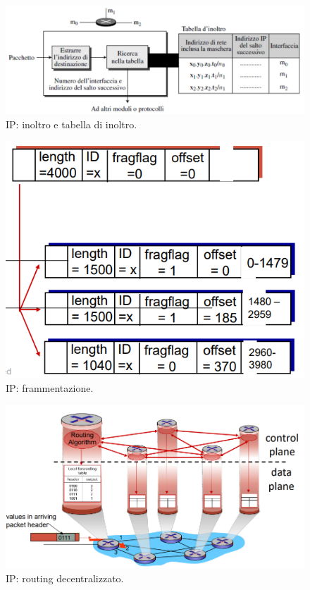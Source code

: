 \documentclass[11pt, italian, openany]{book}
\begin{document}
\begin{sloppypar}
\begin{figure}[!h]
	\centering
	\includegraphics[scale=0.35]{images/ip-tabella-inoltro.png}
	\caption{IP: inoltro e tabella di inoltro.}
	\label{fig:ip-tabella-inoltro}
\end{figure}

\pagebreak

\begin{figure}[!h]
	\centering
	\includegraphics[scale=0.35]{images/ip-frammentazione.png}
	\caption{IP: frammentazione.}
	\label{fig:ip-frammentazione}
\end{figure}

\begin{figure}[!h]
	\centering
	\includegraphics[scale=0.35]{images/ip-routing-decentralizzato.png}
	\caption{IP: routing decentralizzato.}
	\label{fig:ip-routing-decentralizzato}
\end{figure}


\end{sloppypar}
\end{document}
